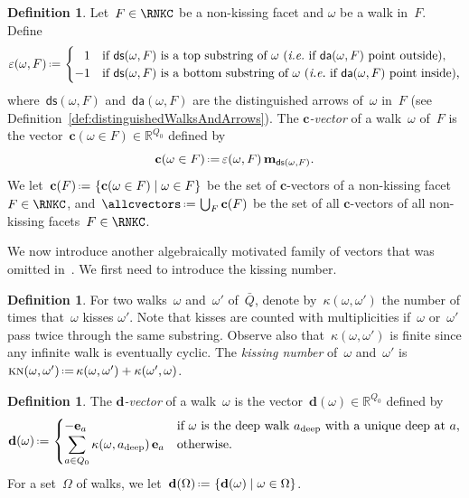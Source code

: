 \documentclass{amsart}
\theoremstyle{definition}
\newtheorem{definition}[theorem]{Definition}
\newcommand{\R}{\mathbb{R}} %
\renewcommand{\b}[1]{\mathbf{#1}} %
\newcommand{\set}[2]{\left\{ #1 \;\middle|\; #2 \right\}} %
\newcommand{\eqdef}{\mbox{\,\raisebox{0.2ex}{\scriptsize\ensuremath{\mathrm:}}\ensuremath{=}\,}} %
\newcommand{\ie}{\textit{i.e.}~} %
\newcommand{\darkblue}{\color{darkblue}} %
\newcommand{\defn}[1]{\textsl{\darkblue #1}} %
\newcommand{\distinguishedArrows}[2]{\mathsf{da}(#1,#2)} %
\newcommand{\distinguishedString}[2]{\mathsf{ds}(#1,#2)} %
\newcommand{\distinguishedSign}[2]{\varepsilon(#1,#2)} %
\newcommand{\kn}{\kappa} %
\newcommand{\KN}{\textsc{kn}} %
\newcommand{\deep}{\mathrm{deep}} %
\newcommand{\dvector}[1]{\mathbf{d}(#1)} %
\newcommand{\dvectors}[1]{\mathbf{d}(#1)} %
\newcommand{\cvector}[2]{\mathbf{c}(#1 \in #2)} %
\newcommand{\cvectors}[1]{\mathbf{c}(#1)} %
\newcommand{\multiplicityVector}{\b{m}} %
\begin{document}
\begin{definition}
\label{def:cVectorsWalks}
Let~$F \in \RNKC$ be a non-kissing facet and $\omega$ be a walk in~$F$.
Define
\[
\distinguishedSign{\omega}{F} \eqdef 
\begin{cases}
\phantom{-}1 & \text{if~$\distinguishedString{\omega}{F}$ is a top substring of~$\omega$ (\ie if~$\distinguishedArrows{\omega}{F}$ point outside),} \\
-1 & \text{if~$\distinguishedString{\omega}{F}$ is a bottom substring of~$\omega$ (\ie if~$\distinguishedArrows{\omega}{F}$ point inside),}
\end{cases}
\]
where~$\distinguishedString{\omega}{F}$ and~$\distinguishedArrows{\omega}{F}$ are the distinguished arrows of~$\omega$ in~$F$ (see Definition~\ref{def:distinguishedWalksAndArrows}).
The \defn{$\b{c}$-vector} of a walk~$\omega$ of~$F$ is the vector~${\cvector{\omega}{F} \in \R^{Q_0}}$ defined by
\[
\cvector{\omega}{F} \eqdef \distinguishedSign{\omega}{F} \, \multiplicityVector_{\distinguishedString{\omega}{F}}.
\]
We let~$\cvectors{F} \eqdef \set{\cvector{\omega}{F}}{\omega \in F}$ be the set of $\b{c}$-vectors of a non-kissing facet~$F \in \RNKC$, and~$\allcvectors \eqdef \bigcup_F \cvectors{F}$ be the set of all $\b{c}$-vectors of all non-kissing facets~${F \in \RNKC}$.
\end{definition}

We now introduce another algebraically motivated family of vectors that was omitted in~\cite{PaluPilaudPlamondon}.
We first need to introduce the kissing number.

\begin{definition}
\label{def:kissingNumber}
For two walks~$\omega$ and~$\omega'$ of~$\bar Q$, denote by~$\kn(\omega,\omega')$ the number of times that~$\omega$ kisses $\omega'$.
Note that kisses are counted with multiplicities if~$\omega$ or~$\omega'$ pass twice through the same substring.
Observe also that~$\kn(\omega,\omega')$ is finite since any infinite walk is eventually cyclic.
The \defn{kissing number} of~$\omega$ and~$\omega'$ is~$\KN(\omega,\omega') \eqdef \kn(\omega,\omega') + \kn(\omega',\omega)$.
\end{definition}

\begin{definition}
\label{def:dVectorsWalks}
The \defn{$\b{d}$-vector} of a walk~$\omega$ is the vector~$\dvector{\omega} \in \R^{Q_0}$ defined by
\[
\dvector{\omega} \eqdef 
\begin{cases}
- \b{e}_a & \text{if $\omega$ is the deep walk~$a_\deep$ with a unique deep at~$a$,} \\
\displaystyle \sum_{a \in Q_0} \kn(\omega, a_\deep) \, \b{e}_a & \text{otherwise.}
\end{cases}
\]
For a set~$\Omega$ of walks, we let~$\dvectors{\Omega} \eqdef \set{\dvector{\omega}}{\omega \in \Omega}$.
\end{definition}
\end{document}
